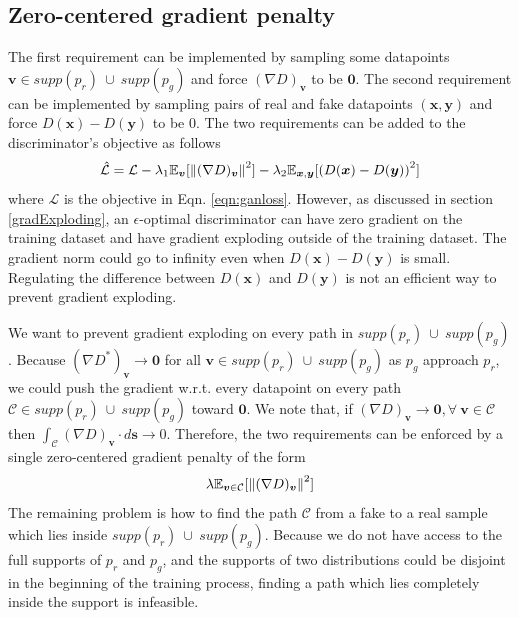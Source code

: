 \documentclass{article} %
\begin{document}
\subsection{Zero-centered gradient penalty}
The first requirement can be implemented by sampling some datapoints $\bm v \in supp(p_r) \ \cup\ supp(p_g)$ and force $(\nabla D)_{\bm v}$ to be $\bm 0$.
The second requirement can be implemented by sampling pairs of real and fake datapoints $(\bm x, \bm y)$ and force $D(\bm x) - D(\bm y)$ to be 0. The two requirements can be added to the discriminator's objective as follows
\begin{equation*}
\hat{\mathcal{L}} = \mathcal{L} - \lambda_1 \mathbb{E}_{\bm v}[\norm{(\nabla D)_{\bm v}}^2] - \lambda_2 \mathbb{E}_{\bm x, \bm y}[\left( D(\bm x) - D(\bm y) \right)^2]
\end{equation*}
where $\mathcal{L}$ is the objective in Eqn. \ref{eqn:ganloss}.
However, as discussed in section \ref{gradExploding}, an $\epsilon$-optimal discriminator can have zero gradient on the training dataset and have gradient exploding outside of the training dataset. The gradient norm could go to infinity even when $D(\bm x) - D(\bm y)$ is small. Regulating the difference between $D(\bm x)$ and $D(\bm y)$ is not an efficient way to prevent gradient exploding. 

We want to prevent gradient exploding on every path in $supp(p_r) \ \cup\ supp(p_g)$. Because $(\nabla D^*)_{\bm v} \rightarrow \bm 0$ for all $\bm v \in supp(p_r)\ \cup\ supp(p_g)$ as $p_g$ approach $p_r$, we could push the gradient w.r.t. every datapoint on every path $\mathcal{C} \in supp(p_r)\ \cup\ supp(p_g)$ toward $\bm 0$. We note that, if $(\nabla D)_{\bm v} \rightarrow \bm 0, \forall \ \bm v \in \mathcal{C}$ then $\int_{\mathcal{C}}{(\nabla D)_{\bm v} \cdot d\bm s} \rightarrow 0$. Therefore, the two requirements can be enforced by a single zero-centered gradient penalty of the form 
\begin{equation*}
\lambda \mathbb{E}_{\bm v \in \mathcal{C}}[\norm{(\nabla D)_{\bm v}}^2]
\end{equation*}
The remaining problem is how to find the path $\mathcal{C}$ from a fake to a real sample which lies inside $supp(p_r)\ \cup\ supp(p_g)$. Because we do not have access to the full supports of $p_r$ and $p_g$, and the supports of two distributions could be disjoint in the beginning of the training process, finding a path which lies completely inside the support is infeasible. 
\end{document}
